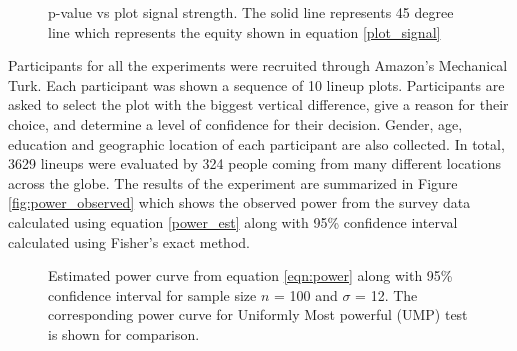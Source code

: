 \documentclass{article}
\begin{document}
\begin{figure}[hbtp]
   \centering
       \caption{p-value vs plot signal strength. The solid line represents 45 degree line which represents the equity shown in equation \eqref{plot_signal}}
       \label{fig:pval_plot_signal}
\end{figure}




Participants for all the experiments were recruited through \cite{turk} Amazon's Mechanical Turk. Each participant was shown a sequence of 10 lineup plots. Participants are asked to select the plot with the biggest vertical difference, give a reason for their choice, and determine a level of  confidence for their decision. Gender, age, education and geographic location of each participant are also collected.
 In total, 3629 lineups were evaluated by 324 people coming from many different locations across the globe.  The results of the experiment are summarized in Figure \ref{fig:power_observed} which shows the observed power from the survey data calculated using equation \eqref{power_est} along with 95\% confidence interval calculated using Fisher's exact method.

\begin{figure}[hbtp]
   \centering
       \caption{Estimated power curve from equation \eqref{eqn:power} along with 95\% confidence interval for sample size $n$ = 100 and $\sigma$ = 12.  The corresponding power curve for Uniformly Most powerful (UMP) test is shown for comparison.}
       \label{fig:power_model}
\end{figure}
\end{document}

